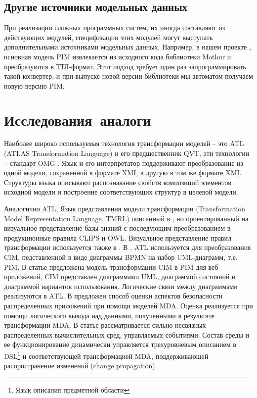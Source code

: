 \documentclass[conference]{IEEEtran} \IEEEoverridecommandlockouts
\begin{document}
\subsection{Другие источники модельных данных} \label{sec:other-models}

При реализации сложных программных систем, их иногда составляют из действующих модулей, спецификации этих модулей могут выступать дополнительными источниками модельных данных. Например, в нашем проекте \cite{bit2019}, основная модель PIM извлекается из исходного кода библиотеки Mothur и преобразуются в ТТЛ-формат. Этот подход требует один раз запрограммировать такой конвертер, и при выпуске новой версии библиотеки мы автоматом получаем новую версию PIM.

\section{Исследования--аналоги}

Наиболее широко используемая технология трансформации моделей -- это ATL (ATLAS Transformation Language) \cite{atl} и его предшественник QVT, эти технологии -- стандарт OMG \cite{QVT}. Язык и его интерпретатор поддерживают преобразование из одной модели, сохраненной в формате XMI, в другую в том же формате XMI. Структуры языка описывают распознавание свойств композиций элементов исходной модели и построение соответствующих структур в целевой модели.

Аналогично ATL, Язык представления модели трансформации (Transformation Model Representation Language, TMRL) описанный в \cite{nikita}, но ориентированный на визуальное представление базы знаний с последующим преобразованием в продукционные правила CLIPS и OWL. Визуальное представление правил трансформации используется также в \cite{GT}. В \cite{azis}, ATL используется для преобразования CIM, педставленной в виде диаграммы BPMN на набор UML-диаграмм, т.е. PIM. В статье \cite{Rhazali} предложена модель трансформации CIM в PIM для веб-приложений, CIM представлен диаграммами UML, диаграммой состояний и диаграммой вариантов использования.  Логические связи между диаграммами реализуются в ATL. В \cite{Hamid} предложен способ оценки аспектов безопасности распределенных приложений при помощи моделей MDA.  Оценка реализуется при помощи логического вывода над данными, полученными в результате трансформации MDA. В статье \cite{Zdun} рассматривается сильно несвязных распределенных вычислительных сред, управляемых событиями.  Состав среды и ее функционирование динамически управляется трехуровневым описанием в DSL\footnote{Язык описания предметной области } и соответствующей трансформацией MDA, поддерживающей распространение изменений (change propagation).
\end{document}
